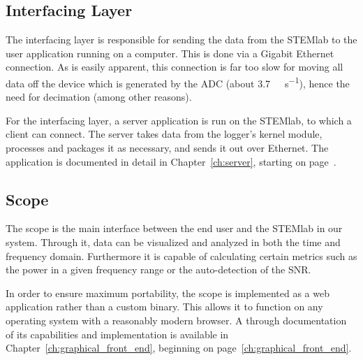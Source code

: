 \subsection{Interfacing Layer} %
\label{subsec:concept:interfacing_layer}

The interfacing layer is responsible for  sending the data from the STEMlab to
the  user application  running  on  a computer. This  is  done  via a  Gigabit
Ethernet connection. As  is easily apparent,  this connection is far  too slow
for  moving all  data off  the device  which is  generated by  the ADC  (about
\SI{3.7}{\gibi\byte\per\second}), hence  the need for decimation  (among other
reasons).

For the  interfacing layer,  a server  application is run  on the  STEMlab, to
which a  client can connect. The  server takes  data from the  logger's kernel
module,  processes  and packages  it  as  necessary,  and  sends it  out  over
Ethernet.  The application is documented in detail in Chapter~\ref{ch:server},
starting on page~\pageref{ch:server}.

%
%
\subsection{Scope} %
\label{subsec:concept:scope}

The scope is  the main interface between  the end user and the  STEMlab in our
system. Through it, data  can be visualized and analyzed in  both the time and
frequency domain.   Furthermore it is  capable of calculating  certain metrics
such as the power in a given frequency range or the auto-detection of the SNR.

In  order  to  ensure  maximum   portability,  the  scope  is  implemented  as
a   web   application   rather   than  a   custom   binary. This   allows   it
to   function   on   any   operating   system   with   a   reasonably   modern
browser. A  through  documentation  of  its  capabilities  and  implementation
is   available    in   Chapter~\ref{ch:graphical_front_end},    beginning   on
page~\ref{ch:graphical_front_end}.

